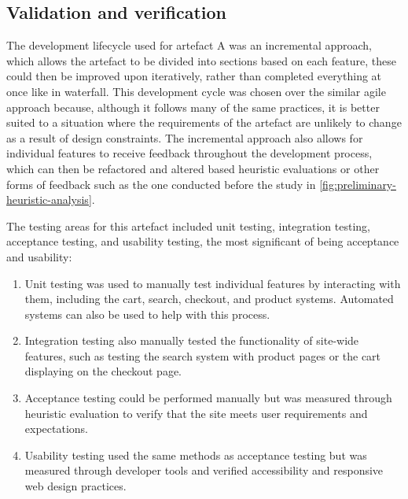 \documentclass[article]{IEEEtran}
\begin{document}
        \subsection{Validation and verification}
            The development lifecycle used for artefact A was an incremental approach, which allows the artefact to be divided into sections based on each feature, these could then be improved upon iteratively, rather than completed everything at once like in waterfall. This development cycle was chosen over the similar agile approach because, although it follows many of the same practices, it is better suited to a situation where the requirements of the artefact are unlikely to change as a result of design constraints. The incremental approach also allows for individual features to receive feedback throughout the development process, which can then be refactored and altered based heuristic evaluations or other forms of feedback such as the one conducted before the study in \autoref{fig:preliminary-heuristic-analysis}.
    
            The testing areas for this artefact included unit testing, integration testing, acceptance testing, and usability testing, the most significant of being acceptance and usability:
            \begin{enumerate}
                \item Unit testing was used to manually test individual features by interacting with them, including the cart, search, checkout, and product systems. Automated systems can also be used to help with this process.
                \item Integration testing also manually tested the functionality of site-wide features, such as testing the search system with product pages or the cart displaying on the checkout page.
                \item Acceptance testing could be performed manually but was measured through heuristic evaluation to verify that the site meets user requirements and expectations.
                \item Usability testing used the same methods as acceptance testing but was measured through developer tools and verified accessibility and responsive web design practices.
            \end{enumerate}
    
\end{document}
